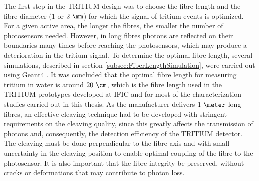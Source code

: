 The first step in the TRITIUM design was to choose the fibre length and the fibre diameter ($1$ or $2~\mm$) for which the signal of tritium events is optimized. For a given active area, the longer the fibres, the smaller the number of photosensors needed. However, in long fibres photons are reflected on their boundaries many times before reaching the photosensors, which may produce a deterioration in the tritium signal. To determine the optimal fibre length, several simulations, described in section \ref{subsec:FiberLengthSimulation}, were carried out using Geant4 \cite{Geant4WebPage}. It was concluded that the optimal fibre length for measuring tritium in water is around $20~\cm$, which is the fibre length used in the TRITIUM prototypes developed at IFIC and for most of the characterization studies carried out in this thesis. As the manufacturer \cite{SaintGobain} delivers $1~\meter$ long fibres, an effective cleaving technique had to be developed with stringent requirements on the cleaving quality, since this greatly affects the transmission of photons and, consequently, the detection efficiency of the TRITIUM detector. The cleaving must be done perpendicular to the fibre axis and with small uncertainty in the cleaving position to enable optimal coupling of the fibre to the photosensor. It is also important that the fibre integrity be preserved, without cracks or deformations that may contribute to photon loss. 

